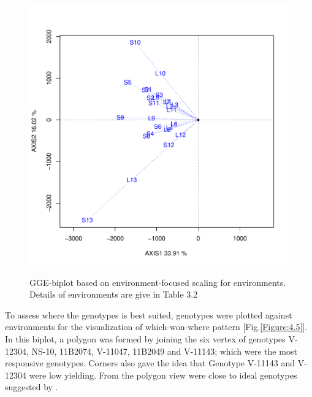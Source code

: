 \begin{figure} [H]
	\centering  
	\scalebox{0.3}
	{\includegraphics[width=460mm]{02ThesisMain/Ch04RD/figures/efscale}}
	\caption[GGE-biplot based on environment-focused scaling for environments]{GGE-biplot based on environment-focused scaling for environments. Details of environments are give in Table 3.2}
\label{Figure:4.4}
\end{figure}



To assess where the genotypes is best suited, genotypes were plotted against environments for the visualization of which-won-where pattern [Fig.\ref{Figure:4.5}]. In this biplot, a polygon was formed by joining the six vertex of genotypes V-12304, NS-10,  11B2074, V-11047, 11B2049 and V-11143; which were the most responsive genotypes. Corners also gave the idea that  Genotype V-11143 and  V-12304 were low yielding. From the polygon view  were close to ideal genotypes suggested by \cite{Yan2005}. 

